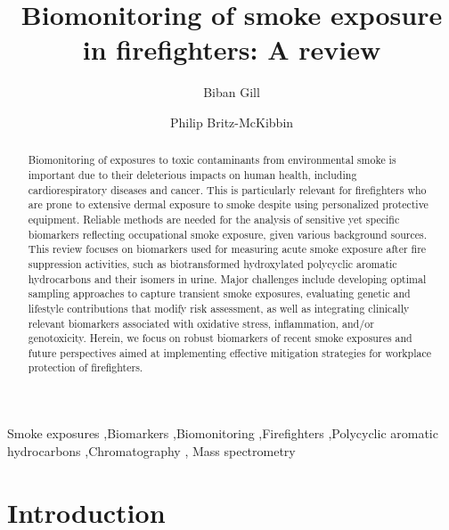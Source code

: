 \documentclass[preprint, 3p,
authoryear]{elsarticle} %
\begin{document}
\begin{frontmatter}

  \title{Biomonitoring of smoke exposure in firefighters: A review}
    \author[Department of Chemistry and Chemical Biology]{Biban Gill%
  }
  
    \author[Department of Chemistry and Chemical Biology]{Philip
Britz-McKibbin%
  }
  
  \begin{abstract}
  Biomonitoring of exposures to toxic contaminants from environmental
  smoke is important due to their deleterious impacts on human health,
  including cardiorespiratory diseases and cancer. This is particularly
  relevant for firefighters who are prone to extensive dermal exposure
  to smoke despite using personalized protective equipment. Reliable
  methods are needed for the analysis of sensitive yet specific
  biomarkers reflecting occupational smoke exposure, given various
  background sources. This review focuses on biomarkers used for
  measuring acute smoke exposure after fire suppression activities, such
  as biotransformed hydroxylated polycyclic aromatic hydrocarbons and
  their isomers in urine. Major challenges include developing optimal
  sampling approaches to capture transient smoke exposures, evaluating
  genetic and lifestyle contributions that modify risk assessment, as
  well as integrating clinically relevant biomarkers associated with
  oxidative stress, inflammation, and/or genotoxicity. Herein, we focus
  on robust biomarkers of recent smoke exposures and future perspectives
  aimed at implementing effective mitigation strategies for workplace
  protection of firefighters.
  \end{abstract}
    \begin{keyword}
    Smoke
exposures \sep Biomarkers \sep Biomonitoring \sep Firefighters \sep Polycyclic
aromatic hydrocarbons \sep Chromatography \sep 
    Mass spectrometry
  \end{keyword}
  
 \end{frontmatter}

\section{Introduction}\label{introduction}
\end{document}
